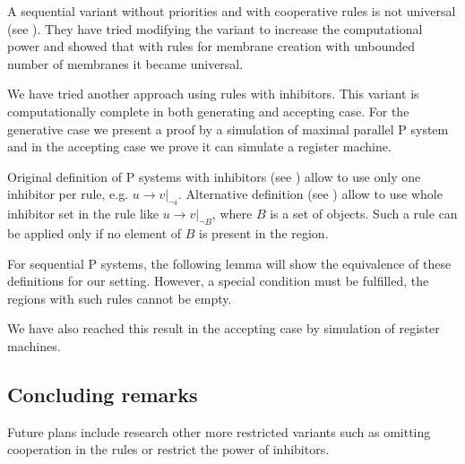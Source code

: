 A sequential variant without priorities and with cooperative rules is not universal (see \cite{Ibarra04dang}). They have tried modifying the variant to increase the computational power and showed that with rules for membrane creation with unbounded number of membranes it became universal.

We have tried another approach using rules with inhibitors. This variant is computationally complete in both generating and accepting case. For the generative case we present a proof by a simulation of maximal parallel P system and in the accepting case we prove it can simulate a register machine.

Original definition of P systems with inhibitors (see \cite{Ionescu:jucs_10_5:on_p_systems_with}) allow to use only one inhibitor per rule, e.g. $u\rightarrow v|_{\neg i}$. Alternative definition (see \cite{Agrigoroaiei:2010:Dissolution}) allow to use whole inhibitor set in the rule like $u\rightarrow v|_{\neg B}$, where $B$ is a set of objects. Such a rule can be applied only if no element of $B$ is present in the region.

For sequential P systems, the following lemma will show the equivalence of these definitions for our setting. However, a special condition must be fulfilled, the regions with such rules cannot be empty.



We have also reached this result in the accepting case by simulation of register machines.



\subsection{Concluding remarks} %
\label{sub:concluding_remarks_of_inhibitors}

Future plans include research other more restricted variants such as omitting cooperation in the rules or restrict the power of inhibitors.

